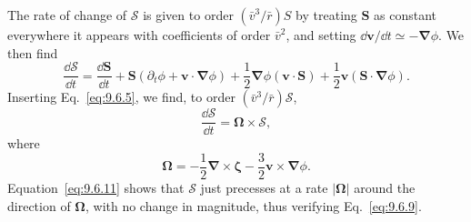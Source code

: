 The rate of change of \(\boldsymbol{\mathcal S}\) is given to order
\((\bar v^3/\bar r)S\) by treating \(\mathbf S\) as constant everywhere
it appears with coefficients of order \(\bar v^2\), and setting
\(\dd\mathbf v/\dd t\simeq-\boldsymbol\nabla\phi\). We then find
\[
  \frac{\dd\boldsymbol{\mathcal S}}{\dd t}
  =
  \frac{\dd\mathbf S}{\dd t}
  +\mathbf S\left(\partial_t\phi
    +\mathbf v\cdot\boldsymbol\nabla\phi\right)
  +\frac12\boldsymbol\nabla\phi(\mathbf v\cdot\mathbf S)
  +\frac12\mathbf v(\mathbf S\cdot\boldsymbol\nabla\phi).
\]
Inserting Eq.~\eqref{eq:9.6.5}, we find, to order
\((\bar v^3/\bar r)\boldsymbol{\mathcal S}\),
\begin{equation}
  \frac{\dd\boldsymbol{\mathcal S}}{\dd t}
  =
  \boldsymbol\Omega\times\boldsymbol{\mathcal S},
  \tag{9.6.11}\label{eq:9.6.11}
\end{equation}
where
\begin{equation}
  \boldsymbol\Omega
  =
  -\frac12\boldsymbol\nabla\times\boldsymbol\zeta
  {}-\frac32\mathbf v\times\boldsymbol\nabla\phi.
  \tag{9.6.12}\label{eq:9.6.12}
\end{equation}
Equation~\eqref{eq:9.6.11} shows that \(\boldsymbol{\mathcal S}\) just
precesses at a rate \(|\boldsymbol\Omega|\) around the direction of
\(\boldsymbol\Omega\), with no change in magnitude, thus verifying
Eq.~\eqref{eq:9.6.9}.

